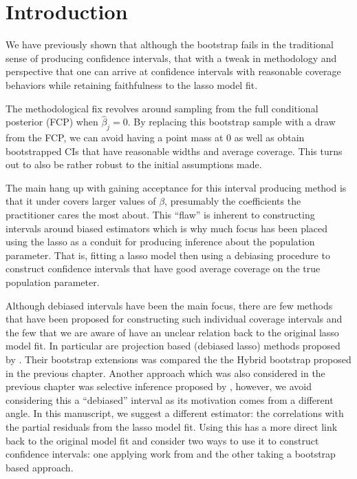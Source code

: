 \section{Introduction}

We have previously shown that although the bootstrap fails in the traditional sense of producing confidence intervals, that with a tweak in methodology and perspective that one can arrive at confidence intervals with reasonable coverage behaviors while retaining faithfulness to the lasso model fit. 

The methodological fix revolves around sampling from the full conditional posterior (FCP) when $\hat{\beta}_j = 0$. By replacing this bootstrap sample with a draw from the FCP, we can avoid having a point mass at 0 as well as obtain bootstrapped CIs that have reasonable widths and average coverage. This turns out to also be rather robust to the initial assumptions made.

The main hang up with gaining acceptance for this interval producing method is that it under covers larger values of $\beta$, presumably the coefficients the practitioner cares the most about. This ``flaw'' is inherent to constructing intervals around biased estimators which is why much focus has been placed using the lasso as a conduit for producing inference about the population parameter. That is, fitting a lasso model then using a debiasing procedure to construct confidence intervals that have good average coverage on the true population parameter.

Although debiased intervals have been the main focus, there are few methods that have been proposed for constructing such individual coverage intervals and the few that we are aware of have an unclear relation back to the original lasso model fit. In particular are projection based (debiased lasso) methods proposed by \citep{ZhangZhang2014, Javanmard2014}. Their bootstrap extensions was compared the the Hybrid bootstrap proposed in the previous chapter. Another approach which was also considered in the previous chapter was selective inference proposed by \citep{LeeEtAl2016}, however, we avoid considering this a ``debiased'' interval as its motivation comes from a different angle. In this manuscript, we suggest a different estimator: the correlations with the partial residuals from the lasso model fit. Using this has a more direct link back to the original model fit and consider two ways to use it to construct confidence intervals: one applying work from  and the other taking a bootstrap based approach.

